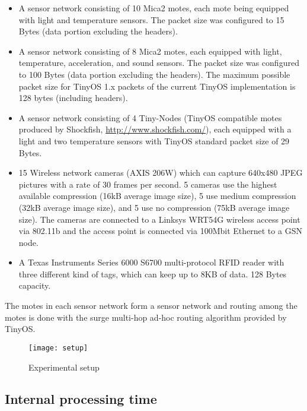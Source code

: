 \begin{itemize}
  
\item A sensor network consisting of 10 Mica2 motes, each mote being equipped
  with light and temperature sensors. The packet size was configured to 15
  Bytes (data portion excluding the headers).
  
\item A sensor network consisting of 8 Mica2 motes, each equipped with light,
  temperature, acceleration, and sound sensors. The packet size was
  configured to 100 Bytes (data portion excluding the headers).  The maximum
  possible packet size for TinyOS 1.x packets of the current TinyOS
  implementation is 128 bytes (including headers).
  
\item A sensor network consisting of 4 Tiny-Nodes (TinyOS compatible motes
  produced by Shockfish, \url{http://www.shockfish.com/}), each equipped with a
  light and two temperature sensors with TinyOS standard packet size of 29
  Bytes.
  
\item 15 Wireless network cameras (AXIS 206W) which can capture 640x480 JPEG
  pictures with a rate of 30 frames per second. 5 cameras use the highest
  available compression (16kB average image size), 5 use medium compression
  (32kB average image size), and 5 use no compression (75kB average image
  size). The cameras are connected to a Linksys WRT54G wireless access point
  via 802.11b and the access point is connected via 100Mbit Ethernet to a GSN
  node.
  
\item A Texas Instruments Series 6000 S6700 multi-protocol RFID reader with
  three different kind of tags, which can keep up to 8KB of data.
  128 Bytes capacity.
  
\end{itemize}

The motes in each sensor network form a sensor network and routing among the
motes is done with the surge multi-hop ad-hoc routing algorithm provided by
TinyOS.

\begin{figure}%
  \centering
  \texttt{[image: setup]}
  \caption{Experimental setup}
  \label{fig:ExperimentalSetup}
\end{figure}


\subsection{Internal processing time}
\label{sec:exepr-eval}

